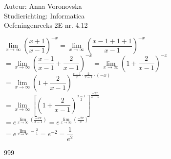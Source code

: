 \documentclass[a4paper]{article}
\begin{document}
  
\noindent \large Auteur: Anna Voronovska \\
\noindent \large Studierichting: Informatica\\
\noindent \large Oefeningenreeks 2E nr. 4.12\\

\medskip

\normalsize

$\lim\limits_{x \to \infty} \left(\dfrac{x+1}{x-1}\right)^{-x} = \lim\limits_{x \to \infty} \left(\dfrac{x-1+1+1}{x-1}\right)^{-x} $ \\

$= \lim\limits_{x \to \infty} \left(\dfrac{x-1}{x-1} + \dfrac{2}{x-1}\right)^{-x} = \lim\limits_{x \to \infty} \left(1 + \dfrac{2}{x-1}\right)^{-x} $ \\

$= \lim\limits_{x \to \infty} \left(1 + \dfrac{2}{x-1}\right)^{\tfrac{x-1}{2} \cdot \tfrac{2}{x-1} \cdot (-x)} $ \\

$= \lim\limits_{x \to \infty} \left[\left(1 + \dfrac{2}{x-1}\right)^{\tfrac{x-1}{2}}\right]^{\tfrac{-2x}{x-1}} $ \\

$= e^{\lim\limits_{x \to \infty} \left(\tfrac{-2x}{x-1}\right)} = e^{\lim\limits_{x \to \infty} \left(\tfrac{-2x}{x}\right)} $ \\

$= e^{\lim\limits_{x \to \infty} -\tfrac{2}{1}} = e^{-2} = \dfrac{1}{e^2}$

\begin{thebibliography}{999}
\end{thebibliography}
\end{document}
